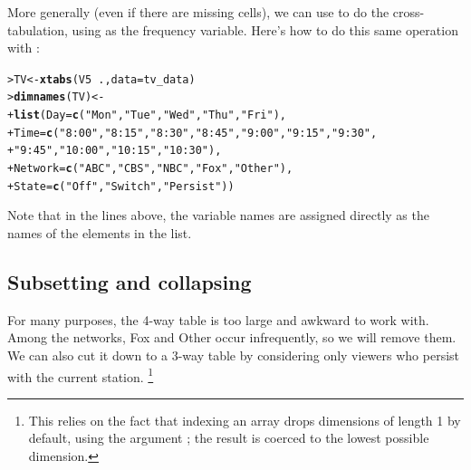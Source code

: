\documentclass[10pt,krantz2]{krantz}\usepackage[]{graphicx}\usepackage[]{color}
\makeatletter
\newcommand{\hlstr}[1]{\textcolor[rgb]{0.192,0.494,0.8}{#1}}%
\newcommand{\hlopt}[1]{\textcolor[rgb]{0,0,0}{#1}}%
\newcommand{\hlstd}[1]{\textcolor[rgb]{0.345,0.345,0.345}{#1}}%
\newcommand{\hlkwb}[1]{\textcolor[rgb]{0.69,0.353,0.396}{#1}}%
\newcommand{\hlkwc}[1]{\textcolor[rgb]{0.333,0.667,0.333}{#1}}%
\newcommand{\hlkwd}[1]{\textcolor[rgb]{0.737,0.353,0.396}{\textbf{#1}}}%
\newenvironment{kframe}{%
 \def\at@end@of@kframe{}%
 \ifinner\ifhmode%
  \def\at@end@of@kframe{\end{minipage}}%
  \begin{minipage}{\columnwidth}%
 \fi\fi%
 \def\FrameCommand##1{\hskip\@totalleftmargin \hskip-\fboxsep
 \colorbox{shadecolor}{##1}\hskip-\fboxsep
     \hskip-\linewidth \hskip-\@totalleftmargin \hskip\columnwidth}%
 \MakeFramed {\advance\hsize-\width
   \@totalleftmargin\z@ \linewidth\hsize
   \@setminipage}}%
 {\par\unskip\endMakeFramed%
 \at@end@of@kframe}
\newenvironment{knitrout}{}{} %
\renewenvironment{knitrout}{\small\renewcommand{\baselinestretch}{.85}}{} %
\makeatother
\begin{document}
More generally (even if there are missing cells), we can
use  to do the cross-tabulation, using  as the
frequency variable.  Here's how to do this same operation with :
\begin{knitrout}
\color{fgcolor}\begin{kframe}
\begin{alltt}
\hlstd{> }\hlstd{TV} \hlkwb{<-} \hlkwd{xtabs}\hlstd{(V5} \hlopt{~} \hlstd{.,} \hlkwc{data} \hlstd{= tv_data)}
\hlstd{> }\hlkwd{dimnames}\hlstd{(TV)} \hlkwb{<-}
\hlstd{+ }    \hlkwd{list}\hlstd{(}\hlkwc{Day} \hlstd{=} \hlkwd{c}\hlstd{(}\hlstr{"Mon"}\hlstd{,} \hlstr{"Tue"}\hlstd{,} \hlstr{"Wed"}\hlstd{,} \hlstr{"Thu"}\hlstd{,} \hlstr{"Fri"}\hlstd{),}
\hlstd{+ }         \hlkwc{Time} \hlstd{=} \hlkwd{c}\hlstd{(}\hlstr{"8:00"}\hlstd{,} \hlstr{"8:15"}\hlstd{,} \hlstr{"8:30"}\hlstd{,} \hlstr{"8:45"}\hlstd{,} \hlstr{"9:00"}\hlstd{,} \hlstr{"9:15"}\hlstd{,} \hlstr{"9:30"}\hlstd{,}
\hlstd{+ }                  \hlstr{"9:45"}\hlstd{,} \hlstr{"10:00"}\hlstd{,} \hlstr{"10:15"}\hlstd{,} \hlstr{"10:30"}\hlstd{),}
\hlstd{+ }         \hlkwc{Network} \hlstd{=} \hlkwd{c}\hlstd{(}\hlstr{"ABC"}\hlstd{,} \hlstr{"CBS"}\hlstd{,} \hlstr{"NBC"}\hlstd{,} \hlstr{"Fox"}\hlstd{,} \hlstr{"Other"}\hlstd{),}
\hlstd{+ }         \hlkwc{State} \hlstd{=} \hlkwd{c}\hlstd{(}\hlstr{"Off"}\hlstd{,} \hlstr{"Switch"}\hlstd{,} \hlstr{"Persist"}\hlstd{))}
\end{alltt}
\end{kframe}
\end{knitrout}
\noindent Note that in the lines above, the variable names are assigned directly
as the names of the elements in the  list.

\subsection{Subsetting and collapsing}
For many purposes,
the 4-way table 
is too large and awkward to work with. Among the networks,
Fox and Other occur infrequently, so we will remove them.
We can also cut it down to a 3-way table by considering only viewers who persist
with the current station.%
\footnote{This relies on the fact that indexing
an array drops dimensions of length 1 by default,
using the argument ;
the result is coerced to the lowest possible dimension.
}
\end{document}
